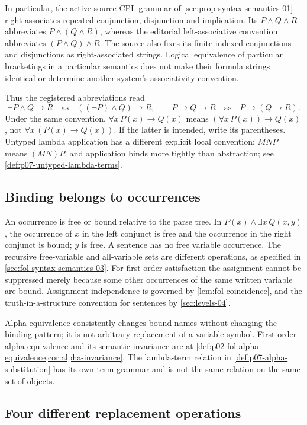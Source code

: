 In particular, the active source CPL grammar of
\cref{sec:prop-syntax-semantics-01} right-associates repeated conjunction,
disjunction and implication. Its \(P\land Q\land R\) abbreviates
\(P\land(Q\land R)\), whereas the editorial left-associative convention
abbreviates \((P\land Q)\land R\). The source also fixes its finite
indexed conjunctions and disjunctions as right-associated strings. Logical
equivalence of particular bracketings in a particular semantics does not
make their formula strings identical or determine another system's
associativity convention.

Thus the registered abbreviations read
\[
 \neg P\land Q\to R\quad\text{as}\quad
 ((\neg P)\land Q)\to R,
 \qquad
 P\to Q\to R\quad\text{as}\quad P\to(Q\to R).
\]
Under the same convention,
\(\forall x\,P(x)\to Q(x)\) means
\((\forall x\,P(x))\to Q(x)\), not
\(\forall x\,(P(x)\to Q(x))\). If the latter is intended, write its
parentheses. Untyped lambda application has a different explicit local
convention: \(MNP\) means \((MN)P\), and application binds more tightly
than abstraction; see \cref{def:p07-untyped-lambda-terms}.

\subsection{Binding belongs to occurrences}

An occurrence is free or bound relative to the parse tree. In
\(P(x)\land\exists x\,Q(x,y)\), the occurrence of \(x\) in the left
conjunct is free and the occurrence in the right conjunct is bound; \(y\)
is free. A sentence has no free variable occurrence. The recursive free-variable
and all-variable sets are different operations, as specified in
\cref{sec:fol-syntax-semantics-03}. For first-order satisfaction the
assignment cannot be suppressed merely because some other occurrences of
the same written variable are bound. Assignment independence is governed by
\cref{lem:fol-coincidence}, and the truth-in-a-structure convention for
sentences by \cref{sec:levels-04}.

Alpha-equivalence consistently changes bound names without changing the
binding pattern; it is not arbitrary replacement of a variable symbol.
First-order alpha-equivalence and its semantic invariance are at
\cref{def:p02-fol-alpha-equivalence,cor:alpha-invariance}. The lambda-term
relation in \cref{def:p07-alpha-substitution} has its own term grammar and
is not the same relation on the same set of objects.

\subsection{Four different replacement operations}

